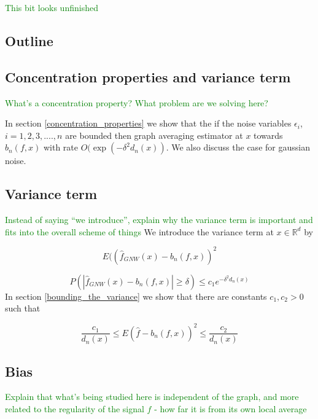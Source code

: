 \documentclass{article}
\newcommand\SB[1]{\textcolor{green}{#1}}
\begin{document}
\SB{This bit looks unfinished}

\subsection{Outline}

\subsection{Concentration properties and variance term}

\SB{What's a concentration property? What problem are we solving here? }

In section \ref{concentration_properties} we show that the if the noise variables $\epsilon_i$, $i=1,2,3,....,n$ are bounded then graph averaging estimator at $x$ towards $b_n(f,x)$ with rate $O(\exp(-\delta^2d_n(x))$. We also discuss the case for gaussian noise.

\subsection{Variance term}

\SB{Instead of saying ``we introduce'', explain why the variance term is
  important and fits into the overall scheme of things}
We introduce the variance term at $x\in\mathbb{R}^d$ by 

\begin{equation}
\label{variance_term}
    E((\hat{f}_{GNW}(x)-b_n(f,x))^2
\end{equation}

\begin{equation*}
    P(|\hat{f}_{GNW}(x)-b_n(f,x)|\geq \delta)\leq c_1e^{-\delta^2d_n(x)}
\end{equation*}
In section \ref{bounding_the_variance} we show that there are constants $c_1,c_2>0$ such that 

\begin{equation*}
    \frac{c_1}{d_n(x)}\leq E(\hat{f}-b_n(f,x))^2\leq \frac{c_2}{d_n(x)}
\end{equation*}


\subsection{Bias}

\SB{Explain that what's being studied here is independent of the graph, and more
  related to the regularity of the signal $f$ - how far it is from its own local
  average}
\end{document}
